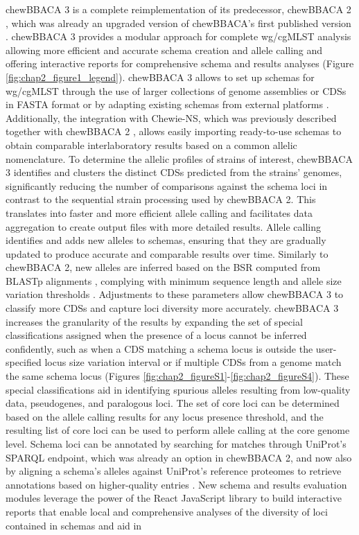 chewBBACA 3 is a complete reimplementation of its predecessor, chewBBACA 2 \citep{mamede_chewie_2021}, which was already an upgraded version of chewBBACA’s first published version \citep{silva_chewbbaca_2018}. chewBBACA 3 provides a modular approach for complete \ac{wg/cgMLST} analysis allowing more efficient and accurate schema creation and allele calling and offering interactive reports for comprehensive schema and results analyses (Figure \ref{fig:chap2_figure1_legend}). chewBBACA 3 allows to set up schemas for \ac{wg/cgMLST} through the use of larger collections of genome assemblies or \acp{CDS} in FASTA format or by adapting existing schemas from external platforms \citep{jolley_bigsdb_2010, zhou_enterobase_2020, noauthor_cgmlstorg_nodate}. Additionally, the integration with Chewie-NS, which was previously described together with chewBBACA 2 \citep{mamede_chewie_2021}, allows easily importing ready-to-use schemas to obtain comparable interlaboratory results based on a common allelic nomenclature. To determine the allelic profiles of strains of interest, chewBBACA 3 identifies and clusters the distinct CDSs predicted from the strains' genomes, significantly reducing the number of comparisons against the schema loci in contrast to the sequential strain processing used by chewBBACA 2. This translates into faster and more efficient allele calling and facilitates data aggregation to create output files with more detailed results. Allele calling identifies and adds new alleles to schemas, ensuring that they are gradually updated to produce accurate and comparable results over time. Similarly to chewBBACA 2, new alleles are inferred based on the \ac{BSR} \citep{rasko_visualization_2005} computed from \ac{BLASTp} alignments \citep{camacho_blast_2009}, complying with minimum sequence length and allele size variation thresholds \citep{silva_chewbbaca_2018}. Adjustments to these parameters allow chewBBACA 3 to classify more \acp{CDS} and capture loci diversity more accurately. chewBBACA 3 increases the granularity of the results by expanding the set of special classifications assigned when the presence of a locus cannot be inferred confidently, such as when a \ac{CDS} matching a schema locus is outside the user-specified locus size variation interval or if multiple \acp{CDS} from a genome match the same schema locus (Figures \ref{fig:chap2_figureS1}-\ref{fig:chap2_figureS4}). These special classifications aid in identifying spurious alleles resulting from low-quality data, pseudogenes, and paralogous loci. The set of core loci can be determined based on the allele calling results for any locus presence threshold, and the resulting list of core loci can be used to perform allele calling at the core genome level. Schema loci can be annotated by searching for matches through UniProt’s \ac{SPARQL} endpoint, which was already an option in chewBBACA 2, and now also by aligning a schema’s alleles against UniProt’s reference proteomes to retrieve annotations based on higher-quality entries \citep{the_uniprot_consortium_uniprot_2025}. New schema and results evaluation modules leverage the power of the React JavaScript library \citep{noauthor_react_nodate} to build interactive reports that enable local and comprehensive analyses of the diversity of loci contained in schemas and aid in 